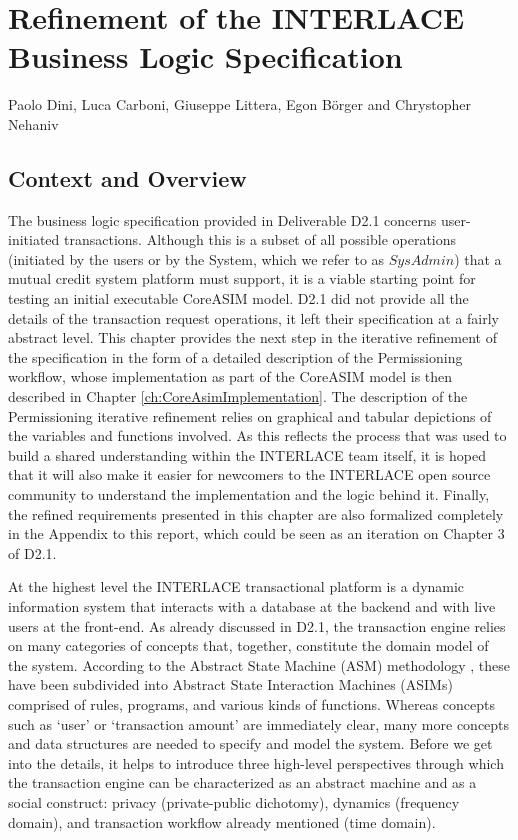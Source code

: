 \chapter{Refinement of the INTERLACE Business Logic Specification}
\label{ch:UpdateBLS}

\vspace{-1cm}
\begin{center}
Paolo Dini, Luca Carboni, Giuseppe Littera, Egon B\"orger and Chrystopher Nehaniv
\end{center}

\section{Context and Overview}
The business logic specification provided in Deliverable D2.1 \cite{INTERLACE_D21} concerns user-initiated transactions. Although this is a subset of all possible operations (initiated by the users or by the System, which we refer to as $SysAdmin$) that a mutual credit system platform must support, it is a viable starting point for testing an initial executable CoreASIM model. D2.1 did not provide all the details of the transaction request operations, it left their specification at a fairly abstract level. This chapter provides the next step in the iterative refinement of the specification in the form of a detailed description of the Permissioning workflow, whose implementation as part of the CoreASIM model is then described in Chapter \ref{ch:CoreAsimImplementation}. The description of the Permissioning iterative refinement relies on graphical and tabular depictions of the variables and functions involved. As this reflects the process that was used to build a shared understanding within the INTERLACE team itself, it is hoped that it will also make it easier for newcomers to the INTERLACE open source community to understand the implementation and the logic behind it. Finally, the refined requirements presented in this chapter are also formalized completely in the Appendix to this report, which could be seen as an iteration on Chapter 3 of D2.1.

At the highest level the INTERLACE transactional platform is a dynamic information system that interacts with a database at the backend and with live users at the front-end. As already discussed in D2.1, the transaction engine relies on many categories of concepts that, together, constitute the domain model of the system. According to the Abstract State Machine (ASM) methodology \cite{BoergerStaerk2003,BoergerRaschke2018}, these have been subdivided into Abstract State Interaction Machines (ASIMs) 
\cite{BIOMICSD42,BIOMICSD52} comprised of rules, programs, and various kinds of functions. Whereas concepts such as `user' or `transaction amount' are immediately clear, many more concepts and data structures are needed to specify and model the system. Before we get into the details, it helps to introduce three high-level perspectives through which the transaction engine can be characterized as an abstract machine and as a social construct: privacy (private-public dichotomy), dynamics (frequency domain), and transaction workflow already mentioned (time domain).

